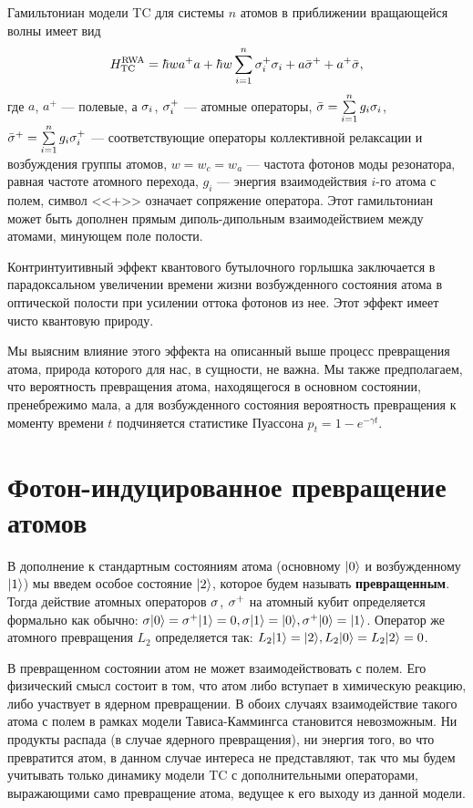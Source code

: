 Гамильтониан модели TC для системы $n$ атомов в приближении вращающейся волны \cite{rwa_rabi_1,rwa_rabi_2,ozhigov_qq} имеет вид
\[
H_{\text{\text{TC}}}^{\text{\text{RWA}}} = \hbar wa^{+}a + \hbar w\sum_{i=1}^{n}\sigma_{i}^{+}\sigma_{i} + a\bar{\sigma}^{+}+a^{+}\bar{\sigma},
\]
где $a$, $a^{+}$ --- полевые, а $\sigma_{i}$, $\sigma_{i}^{+}$ --- атомные операторы, $\bar{\sigma}=\sum\limits_{i=1}^{n}g_{i}\sigma_{i}$, $\bar{\sigma}^{+}=\sum\limits_{i=1}^ng_{i}\sigma^{+}_{i}$ --- соответствующие операторы коллективной релаксации и возбуждения группы атомов, $w = w_{c} = w_{a}$ --- частота фотонов моды резонатора, равная частоте атомного перехода, $g_{i}$ --- энергия взаимодействия $i$-го атома с полем, символ <<+>> означает сопряжение оператора. Этот гамильтониан может быть дополнен прямым диполь-дипольным взаимодействием между атомами, минующем поле полости.

Контринтуитивный эффект квантового бутылочного горлышка заключается в парадоксальном увеличении времени жизни возбужденного состояния атома в оптической полости при усилении оттока фотонов из нее. Этот эффект имеет чисто квантовую природу.

Мы выясним влияние этого эффекта на описанный выше процесс превращения атома, природа которого для нас, в сущности, не важна. Мы также предполагаем, что вероятность превращения атома, находящегося в основном состоянии, пренебрежимо мала, а для возбужденного состояния вероятность превращения к моменту времени $t$ подчиняется статистике Пуассона $p_{t} = 1-e^{-\gamma t}$.

\section{Фотон-индуцированное превращение атомов}\label{sec:ch2/sec2}

В дополнение к стандартным состояниям атома (основному $|0\rangle$ и возбужденному $|1\rangle$) мы введем особое состояние $|2\rangle$, которое будем называть \textbf{превращенным}. Тогда действие атомных операторов $\sigma$, $\sigma^{+}$ на атомный кубит определяется формально как обычно: $\sigma|0\rangle = \sigma^{+}|1\rangle = 0, \sigma|1\rangle = |0\rangle, \sigma^{+}|0\rangle = |1\rangle$. Оператор же атомного превращения $L_{2}$ определяется так: $L_{2}|1\rangle = |2\rangle, L_{2}|0\rangle = L_{2}|2\rangle = 0$.

В превращенном состоянии атом не может взаимодействовать с полем. Его физический смысл состоит в том, что атом либо вступает в химическую реакцию, либо участвует в ядерном превращении. В обоих случаях взаимодействие такого атома с полем в рамках модели Тависа-Каммингса становится невозможным. Ни продукты распада (в случае ядерного превращения), ни энергия того, во что превратится атом, в данном случае интереса не представляют, так что мы будем учитывать только динамику модели TC с дополнительными операторами, выражающими само превращение атома, ведущее к его выходу из данной модели.

